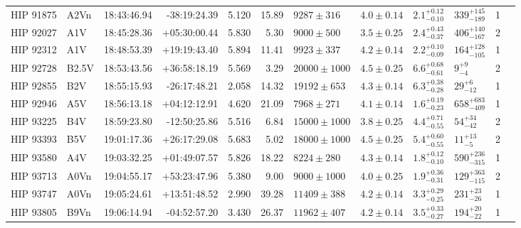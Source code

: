 \begin{tiny}
\begin{longtable}{|l|lrrrrllllll|}
   HIP 91875 &     A2Vn &    18:43:46.94 &   -38:19:24.39 &   5.120 &     15.89 &    $9287 \pm 316$ &  $4.0 \pm 0.14$ &  $2.1^{+0.12}_{-0.10}$ &   $339^{+145}_{-189}$ &       1 \\
   HIP 92027 &      A1V &    18:45:28.36 &   +05:30:00.44 &   5.830 &      5.30 &    $9000 \pm 500$ &  $3.5 \pm 0.25$ &  $2.4^{+0.43}_{-0.37}$ &   $406^{+140}_{-167}$ &       2 \\
   HIP 92312 &      A1V &    18:48:53.39 &   +19:19:43.40 &   5.894 &     11.41 &    $9923 \pm 337$ &  $4.2 \pm 0.14$ &  $2.2^{+0.10}_{-0.09}$ &   $164^{+128}_{-105}$ &       1 \\
   HIP 92728 &    B2.5V &    18:53:43.56 &   +36:58:18.19 &   5.569 &      3.29 &  $20000 \pm 1000$ &  $4.5 \pm 0.25$ &  $6.6^{+0.68}_{-0.61}$ &         $9^{+9}_{-4}$ &       2 \\
   HIP 92855 &      B2V &    18:55:15.93 &   -26:17:48.21 &   2.058 &     14.32 &   $19192 \pm 653$ &  $4.3 \pm 0.14$ &  $6.3^{+0.38}_{-0.28}$ &       $29^{+6}_{-12}$ &       1 \\
   HIP 92946 &      A5V &    18:56:13.18 &   +04:12:12.91 &   4.620 &     21.09 &    $7968 \pm 271$ &  $4.1 \pm 0.14$ &  $1.6^{+0.19}_{-0.23}$ &   $658^{+683}_{-409}$ &       1 \\
   HIP 93225 &      B4V &    18:59:23.80 &   -12:50:25.86 &   5.516 &      6.84 &  $15000 \pm 1000$ &  $3.8 \pm 0.25$ &  $4.4^{+0.71}_{-0.55}$ &      $54^{+34}_{-42}$ &       2 \\
   HIP 93393 &      B5V &    19:01:17.36 &   +26:17:29.08 &   5.683 &      5.02 &  $18000 \pm 1000$ &  $4.5 \pm 0.25$ &  $5.4^{+0.60}_{-0.55}$ &       $11^{+13}_{-5}$ &       2 \\
   HIP 93580 &      A4V &    19:03:32.25 &   +01:49:07.57 &   5.826 &     18.22 &    $8224 \pm 280$ &  $4.3 \pm 0.14$ &  $1.8^{+0.12}_{-0.10}$ &   $590^{+236}_{-315}$ &       1 \\
   HIP 93713 &     A0Vn &    19:04:55.17 &   +53:23:47.96 &   5.380 &      9.00 &   $9000 \pm 1000$ &  $4.0 \pm 0.25$ &  $1.9^{+0.36}_{-0.31}$ &   $129^{+363}_{-115}$ &       2 \\
   HIP 93747 &     A0Vn &    19:05:24.61 &   +13:51:48.52 &   2.990 &     39.28 &   $11409 \pm 388$ &  $4.2 \pm 0.14$ &  $3.3^{+0.29}_{-0.25}$ &     $231^{+23}_{-26}$ &       1 \\
   HIP 93805 &     B9Vn &    19:06:14.94 &   -04:52:57.20 &   3.430 &     26.37 &   $11962 \pm 407$ &  $4.2 \pm 0.14$ &  $3.5^{+0.33}_{-0.27}$ &     $194^{+20}_{-22}$ &       1 \\

\end{longtable}
\end{tiny}
